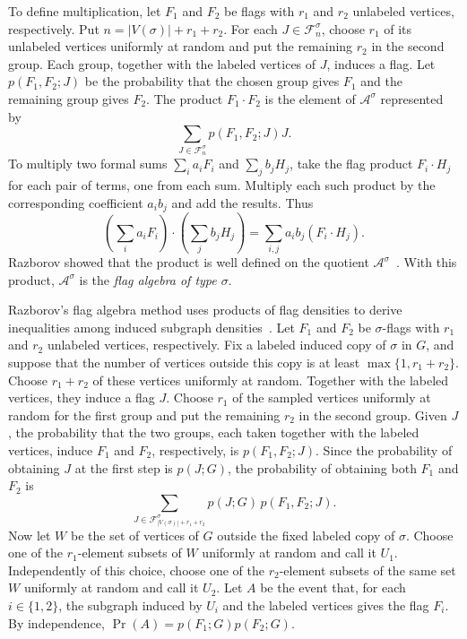 \documentclass[preprint,11pt,numbers]{elsarticle-arxiv}
\numberwithin{equation}{section}
\theoremstyle{definition}
\begin{document}
To define multiplication, let $F_1$ and $F_2$ be flags with
$r_1$ and $r_2$ unlabeled vertices, respectively. Put
$n=|V(\sigma)|+r_1+r_2$. For each $J\in\mathcal F^\sigma_n$,
choose $r_1$ of its unlabeled vertices uniformly at random
and put the remaining $r_2$ in the second group. Each group,
together with the labeled vertices of $J$, induces a flag.
Let $p(F_1,F_2;J)$ be the probability that the chosen group
gives $F_1$ and the remaining group gives $F_2$. The product
$F_1\cdot F_2$ is the element of $\mathcal A^\sigma$ represented by
\[
  \sum_{J\in\mathcal F^\sigma_n}p(F_1,F_2;J)J.
\]
To multiply two formal sums $\sum_i a_iF_i$ and $\sum_j b_jH_j$,
take the flag product $F_i\cdot H_j$ for each pair of terms, one
from each sum. Multiply each such product by the corresponding
coefficient $a_ib_j$ and add the results. Thus
\[
  \left(\sum_i a_iF_i\right)\cdot\left(\sum_j b_jH_j\right)
  =\sum_{i,j}a_ib_j(F_i\cdot H_j).
\]
Razborov showed that the product is well defined on the quotient
$\mathcal A^\sigma$~\cite{Razborov2007}. With this product,
$\mathcal A^\sigma$ is the \emph{flag algebra of type $\sigma$}.

Razborov's flag algebra method uses products of flag densities
to derive inequalities among induced subgraph
densities~\cite{Razborov2007,CarliSilvaOliveiraSato2016}.
Let $F_1$ and $F_2$ be $\sigma$-flags with $r_1$ and $r_2$
unlabeled vertices, respectively. Fix a labeled induced copy
of $\sigma$ in $G$, and suppose that the number of vertices
outside this copy is at least $\max\{1,r_1+r_2\}$. Choose
$r_1+r_2$ of these vertices uniformly at random. Together with
the labeled vertices, they induce a flag $J$. Choose $r_1$ of
the sampled vertices uniformly at random for the first group
and put the remaining $r_2$ in the second group. Given $J$,
the probability that the two groups, each taken together with
the labeled vertices, induce $F_1$ and $F_2$, respectively, is
$p(F_1,F_2;J)$. Since the probability of obtaining $J$ at the
first step is $p(J;G)$, the probability of obtaining both
$F_1$ and $F_2$ is
\[
  \sum_{J\in\mathcal F^\sigma_{|V(\sigma)|+r_1+r_2}}
  p(J;G)\,p(F_1,F_2;J).
\]
Now let $W$ be the set of vertices of $G$ outside the fixed labeled
copy of $\sigma$. Choose one of the $r_1$-element subsets of $W$
uniformly at random and call it $U_1$. Independently of this
choice, choose one of the $r_2$-element subsets of the same set
$W$ uniformly at random and call it $U_2$. Let $A$ be the event
that, for each $i\in\{1,2\}$, the subgraph induced by $U_i$ and
the labeled vertices gives the flag $F_i$. By independence,
$\Pr(A)=p(F_1;G)p(F_2;G)$.
\end{document}
